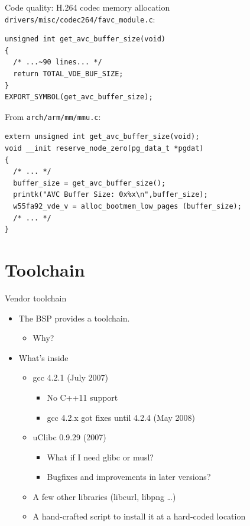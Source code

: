 \documentclass[xetex,table]{beamer}
\begin{document}
\begin{frame}[fragile]{Code quality: H.264 codec memory allocation}
  \linespread{1}
  \texttt{drivers/misc/codec264/favc\_module.c}:

  \begin{verbatim}
unsigned int get_avc_buffer_size(void)
{
  /* ...~90 lines... */
  return TOTAL_VDE_BUF_SIZE;
}
EXPORT_SYMBOL(get_avc_buffer_size);
  \end{verbatim}

  From {\small\texttt{arch/arm/mm/mmu.c}}:
  \begin{verbatim}
extern unsigned int get_avc_buffer_size(void);
void __init reserve_node_zero(pg_data_t *pgdat)
{
  /* ... */
  buffer_size = get_avc_buffer_size();
  printk("AVC Buffer Size: 0x%x\n",buffer_size);
  w55fa92_vde_v = alloc_bootmem_low_pages (buffer_size);
  /* ... */
}
  \end{verbatim}
\end{frame}

\section{Toolchain}

\begin{frame}{Vendor toolchain}
  \begin{itemize}
  \item The BSP provides a toolchain.
    \begin{itemize}
    \item Why?
    \end{itemize}
  \item What's inside
    \begin{itemize}
    \item gcc 4.2.1 (July 2007)
      \begin{itemize}
      \item No C++11 support
      \item gcc 4.2.x got fixes until 4.2.4 (May 2008)
      \end{itemize}
    \item uClibc 0.9.29 (2007)
      \begin{itemize}
      \item What if I need glibc or musl?
      \item Bugfixes and improvements in later versions?
      \end{itemize}
    \item A few other libraries (libcurl, libpng \dots)
    \item A hand-crafted script to install it at a hard-coded location
    \end{itemize}
  \end{itemize}
\end{frame}
\end{document}
